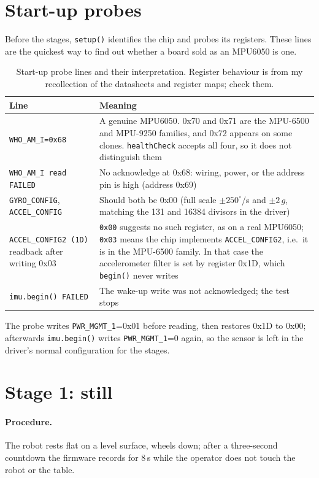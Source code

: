 \documentclass[11pt,a4paper]{report}
\newcommand{\code}[1]{\texttt{#1}}
\begin{document}
\section{Start-up probes}
Before the stages, \code{setup()} identifies the chip and probes its registers. These lines are the quickest way to find out whether a board sold as an MPU6050 is one.

\begin{table}[H]
\centering
\caption{Start-up probe lines and their interpretation. Register behaviour is from my recollection of the datasheets and register maps; check them.}\label{tab:probes}
\small
\begin{tabular}{@{}p{4.2cm}p{9.6cm}@{}}
\toprule
Line & Meaning\\
\midrule
\code{WHO\_AM\_I=0x68} & A genuine MPU6050. 0x70 and 0x71 are the MPU-6500 and MPU-9250 families, and 0x72 appears on some clones. \code{healthCheck} accepts all four, so it does not distinguish them\\
\code{WHO\_AM\_I read FAILED} & No acknowledge at 0x68: wiring, power, or the address pin is high (address 0x69)\\
\code{GYRO\_CONFIG}, \code{ACCEL\_CONFIG} & Should both be 0x00 (full scale $\pm250^\circ$/s and $\pm2\,g$, matching the 131 and 16384 divisors in the driver)\\
\code{ACCEL\_CONFIG2 (1D)} readback after writing 0x03 & \code{0x00} suggests no such register, as on a real MPU6050; \code{0x03} means the chip implements \code{ACCEL\_CONFIG2}, i.e.\ it is in the MPU-6500 family. In that case the accelerometer filter is set by register 0x1D, which \code{begin()} never writes\\
\code{imu.begin() FAILED} & The wake-up write was not acknowledged; the test stops\\
\bottomrule
\end{tabular}
\end{table}
The probe writes \code{PWR\_MGMT\_1}=0x01 before reading, then restores 0x1D to 0x00; afterwards \code{imu.begin()} writes \code{PWR\_MGMT\_1}=0 again, so the sensor is left in the driver's normal configuration for the stages.

\section{Stage 1: still}\label{sec:s1}
\paragraph{Procedure.} The robot rests flat on a level surface, wheels down; after a three-second countdown the firmware records for 8\,s while the operator does not touch the robot or the table.
\end{document}
